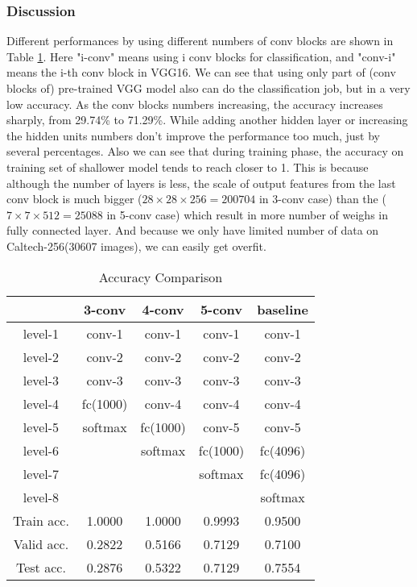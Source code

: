 \subsubsection{Discussion}
Different performances by using different numbers of conv blocks are shown in Table \ref{tab-cmp}. Here "i-conv" means using i conv blocks for classification, and "conv-i" means the i-th conv block in VGG16. We can see that using only part of (conv blocks of) pre-trained VGG model also can do the classification job, but in a very low accuracy. As the conv blocks numbers increasing, the accuracy increases sharply, from 29.74\% to 71.29\%. While adding another hidden layer or increasing the hidden units numbers don't improve the performance too much, just by several percentages. Also we can see that during training phase, the accuracy on training set of shallower model tends to reach closer to 1. This is because although the number of layers is less, the scale of output features from the last conv block is much bigger ($28\times 28\times 256=200704$ in 3-conv case) than the ($7\times 7\times 512=25088$ in 5-conv case) which result in more number of weighs in fully connected layer. And because we only have limited number of data on Caltech-256(30607 images), we can easily get overfit.

\begin{table}[H]
	\caption{Accuracy Comparison}
	\centering
	\begin{tabular}{|c|c|c|c|c|}
		\hline
		 & 3-conv & 4-conv & 5-conv & baseline\\
		\hline
		level-1 & conv-1   & conv-1   & conv-1   & conv-1\\
		\hline
		level-2 & conv-2   & conv-2   & conv-2   & conv-2\\
		\hline
		level-3 & conv-3   & conv-3   & conv-3   & conv-3\\
		\hline
		level-4 & fc(1000) & conv-4   & conv-4   & conv-4\\
		\hline
		level-5 & softmax  & fc(1000) & conv-5   & conv-5\\
        \hline
		level-6 &          & softmax  & fc(1000) & fc(4096)\\		
		\hline
		level-7 &          &          & softmax  & fc(4096)\\
		\hline
		level-8 &          &          &          & softmax\\
		\hline
		Train acc. &1.0000 & 1.0000   & 0.9993   & 0.9500 \\
		\hline
		Valid acc. &0.2822 & 0.5166   & 0.7129   & 0.7100 \\
		\hline		
		Test acc.  &0.2876 & 0.5322   & 0.7129   & 0.7554 \\
		\hline		
	\end{tabular}
	\label{tab-cmp}
\end{table}